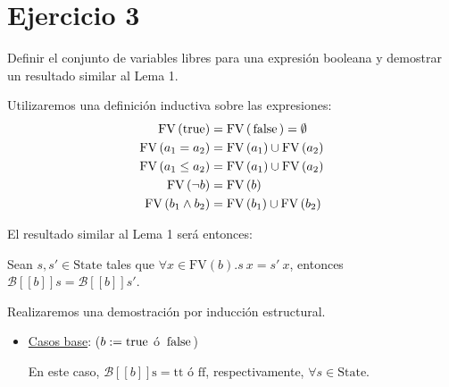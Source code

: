\section{Ejercicio 3}
\begin{enun}
    Definir el conjunto de variables libres para una expresión booleana y
    demostrar un resultado similar al Lema 1.
\end{enun}
\begin{sol}
    Utilizaremos una definición inductiva sobre las expresiones:
    \begin{align*}
        \mathrm{FV}\left( \lstinline{true} \right) &= \mathrm{FV}\left(
        \lstinline{false} \right) = \emptyset\\
        \mathrm{FV}\left( a_1 = a_2 \right) &= \mathrm{FV}\left( a_1 \right) \cup
        \mathrm{FV}\left( a_2 \right)\\
        \mathrm{FV}\left( a_1 \le a_2 \right) &= \mathrm{FV}\left( a_1 \right) \cup
        \mathrm{FV}\left( a_2 \right)\\
        \mathrm{FV}\left( \neg b \right) &= \mathrm{FV}\left( b \right)\\
        \mathrm{FV}\left( b_1 \land b_2 \right) &= \mathrm{FV}\left( b_1 \right) \cup
        \mathrm{FV}\left( b_2 \right)\\
    \end{align*}

    El resultado similar al Lema 1 será entonces:
    \begin{lema}
        Sean $s, s' \in \mathrm{State}$ tales que $\forall x \in
        \mathrm{FV}\left( b \right).s\ x = s'\ x$, entonces $\mathcal{B}\left[
        \left[ b \right] \right]s = \mathcal{B}[[b]]s'$.
    \end{lema}
    \begin{demo}
        Realizaremos una demostración por inducción estructural.
        \begin{itemize}
        \item \underline{Casos base}: ($b := \lstinline{true}$ ó
        $\lstinline{false}$)

        En este caso, $\mathcal{B}[[b]]\text{s} = \text{tt}$ ó $\text{ff}$, respectivamente, $\forall
        s \in \mathrm{State}$.


\end{itemize}
\end{demo}
\end{sol}
